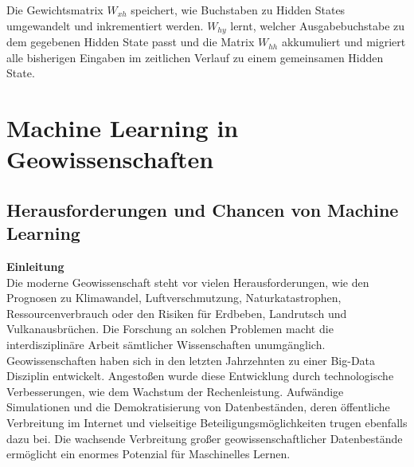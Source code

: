 \documentclass[11pt,ceqn]{book}
\begin{document}
Die Gewichtsmatrix $W_{xh}$ speichert, wie Buchstaben zu Hidden States umgewandelt und inkrementiert werden. $W_{hy}$ lernt, welcher Ausgabebuchstabe zu dem gegebenen Hidden State passt und die Matrix $W_{hh}$ akkumuliert und migriert alle bisherigen Eingaben im zeitlichen Verlauf zu einem gemeinsamen Hidden State.

\newpage
\section{Machine Learning in Geowissenschaften}

\subsection{Herausforderungen und Chancen von Machine Learning  }
\textbf{Einleitung}\\
Die moderne Geowissenschaft steht vor vielen Herausforderungen, wie den Prognosen zu Klimawandel, Luftverschmutzung, Naturkatastrophen, Ressourcenverbrauch oder den Risiken für Erdbeben, Landrutsch und Vulkanausbrüchen. Die Forschung an solchen Problemen macht die interdisziplinäre Arbeit sämtlicher Wissenschaften unumgänglich.
Geowissenschaften haben sich in den letzten Jahrzehnten  zu einer Big-Data Disziplin entwickelt. Angestoßen wurde diese Entwicklung durch technologische Verbesserungen, wie dem Wachstum der Rechenleistung. Aufwändige Simulationen und die Demokratisierung von Datenbeständen, deren öffentliche Verbreitung im Internet und vielseitige Beteiligungsmöglichkeiten trugen ebenfalls dazu bei. Die wachsende Verbreitung großer geowissenschaftlicher Datenbestände ermöglicht ein enormes Potenzial für Maschinelles Lernen\cite{machgeo}.\\

\bigskip
\end{document}

